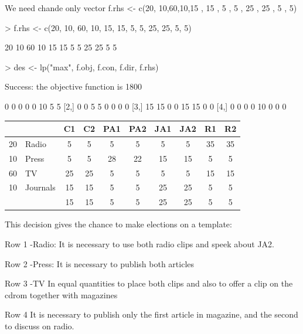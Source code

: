\documentclass[a4paper,11pt]{scrartcl}
\begin{document}
We need  chande   only vector 
f.rhs <- c(20, 10,60,10,15 , 15  ,  5 , 5 , 25 , 25 , 5 , 5)
\begin{Schunk}
\begin{Sinput}
> f.rhs <- c(20, 10, 60, 10, 15, 15, 5, 5, 25, 25, 5, 5)
\end{Sinput}
\begin{Soutput}
 [1] 20 10 60 10 15 15  5  5 25 25  5  5
\end{Soutput}
\begin{Sinput}
> des <- lp("max", f.obj, f.con, f.dir, f.rhs)
\end{Sinput}
\begin{Soutput}
Success: the objective function is 1800 
\end{Soutput}
\begin{Soutput}
     [,1] [,2] [,3] [,4] [,5] [,6] [,7] [,8]
[1,]    0    0    0    0    0   10    5    5
[2,]    0    0    5    5    0    0    0    0
[3,]   15   15    0    0   15   15    0    0
[4,]    0    0    0    0   10    0    0    0
\end{Soutput}
\end{Schunk}
 \begin{tabular}{|l|l |c| c| c| c| c| c| c| c|}
\hline
&      &  C1 & C2  &  PA1 & PA2 & JA1 & JA2 & R1 & R2\\
\hline
20&Radio &  5 & 5  &  5 & 5 & 5 & 5 & 35 & 35\\
\hline
10&Press &  5 & 5  &  28 & 22 &  15 & 15 & 5 & 5\\
\hline
60&TV &  25 & 25  &  5 & 5 & 5 & 5 & 15 & 15\\
\hline
10&Journals &  15 & 15  &  5 & 5 & 25 & 25 & 5 & 5\\
\hline
& &  15 & 15  &  5 & 5 & 25 & 25 & 5 & 5\\
\hline
\end{tabular}

This decision gives the chance to make elections on a template:

Row 1 -Radio:
It is necessary to use both radio clips and speek about JA2. 

Row 2 -Press: 
It is necessary to publish both articles

Row 3 -TV In equal quantities to place both clips and also to offer a clip on the  cdrom together with magazines

Row 4
It is necessary to publish only the first article in magazine, and the second to discuss on radio.
\end{document}
